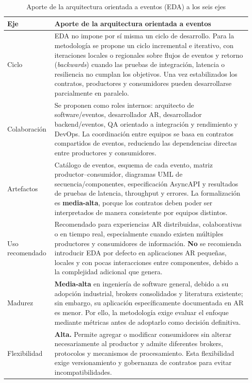 \documentclass[conference]{IEEEtran}
\begin{document}
\begin{table}[!t]
\centering
\footnotesize
\caption{Aporte de la arquitectura orientada a eventos (EDA) a los seis ejes}
\begin{tabular}{p{}p{}}
\hline
\textbf{Eje} & \textbf{Aporte de la arquitectura orientada a eventos} \\ \hline
Ciclo & EDA no impone por sí misma un ciclo de desarrollo. Para la metodología se propone un ciclo incremental e iterativo, con iteraciones locales o regionales sobre flujos de eventos y retorno (\textit{backwards}) cuando las pruebas de integración, latencia o resiliencia no cumplan los objetivos. Una vez estabilizados los contratos, productores y consumidores pueden desarrollarse parcialmente en paralelo. \\ \hline
Colaboración & Se proponen como roles internos: arquitecto de software/eventos, desarrollador AR, desarrollador backend/eventos, QA orientado a integración y rendimiento y DevOps. La coordinación entre equipos se basa en contratos compartidos de eventos, reduciendo las dependencias directas entre productores y consumidores. \\ \hline
Artefactos & Catálogo de eventos, esquema de cada evento, matriz productor–consumidor, diagramas UML de secuencia/componentes, especificación AsyncAPI y resultados de pruebas de latencia, throughput y errores. La formalización es \textbf{media-alta}, porque los contratos deben poder ser interpretados de manera consistente por equipos distintos. \\ \hline
Uso recomendado & Recomendado para experiencias AR distribuidas, colaborativas o en tiempo real, especialmente cuando existen múltiples productores y consumidores de información. \textbf{No} se recomienda introducir EDA por defecto en aplicaciones AR pequeñas, locales y con pocas interacciones entre componentes, debido a la complejidad adicional que genera. \\ \hline
Madurez & \textbf{Media-alta} en ingeniería de software general, debido a su adopción industrial, brokers consolidados y literatura existente; sin embargo, su aplicación específicamente documentada en AR es menor. Por ello, la metodología exige evaluar el enfoque mediante métricas antes de adoptarlo como decisión definitiva. \\ \hline
Flexibilidad & \textbf{Alta.} Permite agregar o modificar consumidores sin alterar necesariamente al productor y admite diferentes brokers, protocolos y mecanismos de procesamiento. Esta flexibilidad exige versionamiento y gobernanza de contratos para evitar incompatibilidades. \\ \hline
\end{tabular}
\end{table}
\end{document}
